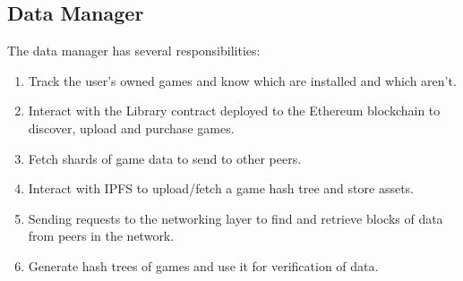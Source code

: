 \subsection{Data Manager}

The data manager has several responsibilities:

\begin{enumerate}
  \item Track the user's owned games and know which are installed and which aren't.
  \item Interact with the Library contract deployed to the Ethereum blockchain to discover, upload and purchase games.
  \item Fetch shards of game data to send to other peers.
  \item Interact with IPFS to upload/fetch a game hash tree and store assets.
  \item Sending requests to the networking layer to find and retrieve blocks of data from peers in the network.
  \item Generate hash trees of games and use it for verification of data.
\end{enumerate}